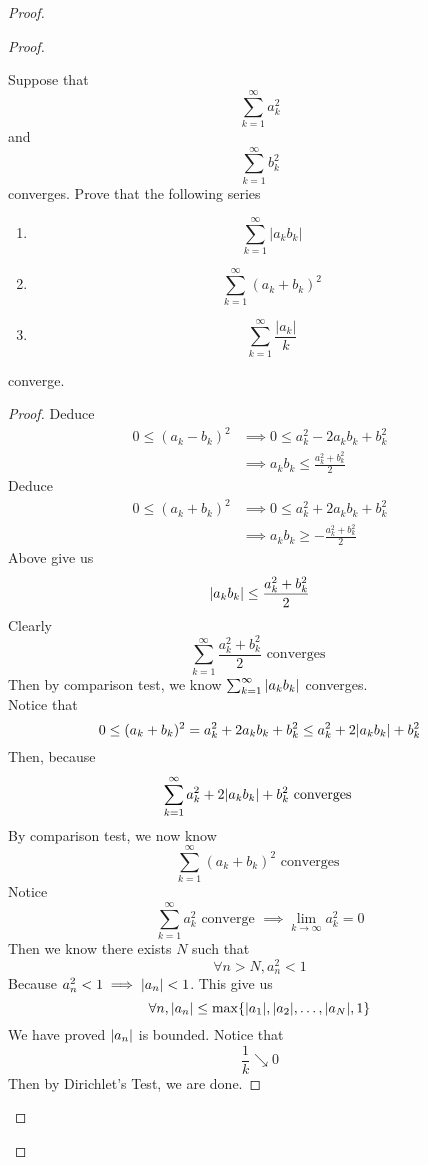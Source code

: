 \documentclass{report}
\begin{document}
\begin{proof}
\begin{proof}
\begin{question}{}{}
Suppose that 
\[
\sum_{k=1}^{\infty} a_k^2
\]
and 
\[
\sum_{k=1}^{\infty} b_k^2
\]
converges. Prove that the following series
\begin{enumerate}
    \item \[
    \sum_{k=1}^{\infty} |a_kb_k|
    \]
    \item \[
    \sum_{k=1}^{\infty} (a_k + b_k)^2
    \]
    \item \[
    \sum_{k=1}^{\infty} \frac{|a_k|}{k}
    \]
\end{enumerate}
converge.
\end{question}
\begin{proof}
Deduce 
\begin{align}
  0\leq (a_k-b_k)^{2}&\implies 0\leq a_k^2-2a_kb_k+b_k^2\\
  &\implies a_kb_k\leq \frac{a_k^2+b_k^2}{2}
\end{align}
Deduce
\begin{align}
  0\leq (a_k+b_k)^2&\implies 0\leq a_k^2+2a_kb_k+b_k^2\\
&\implies a_kb_k\geq  -\frac{a_k^2+b_k^2}{2}
\end{align}
Above give us
\begin{equation}
|a_kb_k|\leq \frac{a_k^2+b_k^2}{2}
\end{equation}
Clearly
\begin{equation}
\sum_{k=1}^\infty \frac{a_k^2+b_k^2}{2}\text{ converges }
\end{equation}
Then by comparison test, we know $\sum_{k=1}^\infty |a_kb_k|$ converges.\\

Notice that
\begin{equation}
  0\leq (a_k+b_k)^2=a_k^2 +2a_kb_k+b_k^2 \leq a_k^2+2|a_kb_k|+b_k^2 
\end{equation}
Then, because 
\begin{equation}
\sum_{k=1}^\infty a_k^2 +2|a_kb_k|+b_k^2\text{ converges }
\end{equation}
By comparison test, we now know 
\begin{equation}
\sum_{k=1}^\infty (a_k+b_k)^2 \text{ converges }
\end{equation}
Notice
\begin{equation}
\sum_{k=1}^\infty a_k^2\text{ converge }\implies \lim_{k\to\infty}a_k^2=0
\end{equation}
Then we know there exists $N$ such that
 \begin{equation}
\forall n>N, a_n^2<1
\end{equation}
Because $a_n^2<1\implies |a_n|<1$. This give us
\begin{equation}
\forall n, |a_n|\leq \max \{ |a_1|,|a_2|,\dots ,|a_N|,1 \}
\end{equation}
We have proved $|a_n|$ is bounded. Notice that 
\begin{equation}
\frac{1}{k}\searrow 0
\end{equation}
Then by Dirichlet's Test, we are done.


\end{proof}
\end{proof}
\end{proof}
\end{document}
